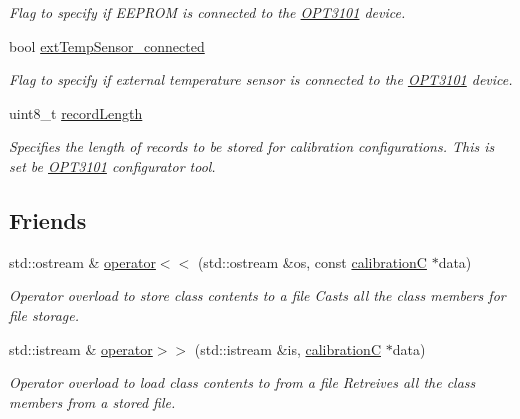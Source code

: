 \begin{DoxyCompactItemize}
\begin{DoxyCompactList}\small\item\em Flag to specify if E\+E\+P\+R\+OM is connected to the \mbox{\hyperlink{namespace_o_p_t3101}{O\+P\+T3101}} device. \end{DoxyCompactList}\item 
bool \mbox{\hyperlink{class_o_p_t3101_1_1calibration_c_a703a4667679ca3cfd19801908cdbf153}{ext\+Temp\+Sensor\+\_\+connected}}
\begin{DoxyCompactList}\small\item\em Flag to specify if external temperature sensor is connected to the \mbox{\hyperlink{namespace_o_p_t3101}{O\+P\+T3101}} device. \end{DoxyCompactList}\item 
uint8\+\_\+t \mbox{\hyperlink{class_o_p_t3101_1_1calibration_c_a8963999e75dd21df70925512905074c0}{record\+Length}}
\begin{DoxyCompactList}\small\item\em Specifies the length of records to be stored for calibration configurations. This is set be \mbox{\hyperlink{namespace_o_p_t3101}{O\+P\+T3101}} configurator tool. \end{DoxyCompactList}\end{DoxyCompactItemize}
\subsection*{Friends}
\begin{DoxyCompactItemize}
\item 
std\+::ostream \& \mbox{\hyperlink{class_o_p_t3101_1_1calibration_c_ad4bd440df02467a0bbb3f15f07a27e2b}{operator$<$$<$}} (std\+::ostream \&os, const \mbox{\hyperlink{class_o_p_t3101_1_1calibration_c}{calibrationC}} $\ast$data)
\begin{DoxyCompactList}\small\item\em Operator overload to store class contents to a file Casts all the class members for file storage. \end{DoxyCompactList}\item 
std\+::istream \& \mbox{\hyperlink{class_o_p_t3101_1_1calibration_c_a06e5b13fed9266160b9ed9f43d17bca8}{operator$>$$>$}} (std\+::istream \&is, \mbox{\hyperlink{class_o_p_t3101_1_1calibration_c}{calibrationC}} $\ast$data)
\begin{DoxyCompactList}\small\item\em Operator overload to load class contents to from a file Retreives all the class members from a stored file. \end{DoxyCompactList}\end{DoxyCompactItemize}


